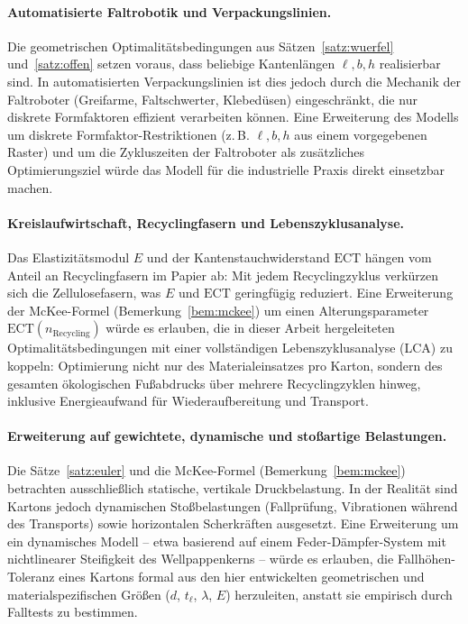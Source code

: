 ﻿\documentclass[a4paper,12pt]{article}
\theoremstyle{definition}
\begin{document}
\paragraph{Automatisierte Faltrobotik und Verpackungslinien.}
Die geometrischen Optimalitätsbedingungen aus Sätzen~\ref{satz:wuerfel}
und~\ref{satz:offen} setzen voraus, dass beliebige Kantenlängen $\ell, b, h$
realisierbar sind. In automatisierten Verpackungslinien ist dies jedoch durch
die Mechanik der Faltroboter (Greifarme, Faltschwerter, Klebedüsen)
eingeschränkt, die nur diskrete Formfaktoren effizient verarbeiten können. Eine
Erweiterung des Modells um diskrete Formfaktor-Restriktionen (z.\,B.
$\ell, b, h$ aus einem vorgegebenen Raster) und um die
Zykluszeiten der Faltroboter als zusätzliches Optimierungsziel würde das Modell
für die industrielle Praxis direkt einsetzbar machen.

\paragraph{Kreislaufwirtschaft, Recyclingfasern und Lebenszyklusanalyse.}
Das Elastizitätsmodul $E$ und der Kantenstauchwiderstand $\mathrm{ECT}$ hängen
vom Anteil an Recyclingfasern im Papier ab: Mit jedem Recyclingzyklus verkürzen
sich die Zellulosefasern, was $E$ und $\mathrm{ECT}$ geringfügig reduziert. Eine
Erweiterung der McKee-Formel (Bemerkung~\ref{bem:mckee}) um einen
Alterungsparameter $\mathrm{ECT}(n_{\text{Recycling}})$ würde es erlauben, die
in dieser Arbeit hergeleiteten Optimalitätsbedingungen mit einer vollständigen
Lebenszyklusanalyse (LCA) zu koppeln: Optimierung nicht nur des
Materialeinsatzes pro Karton, sondern des gesamten ökologischen Fußabdrucks über
mehrere Recyclingzyklen hinweg, inklusive Energieaufwand für Wiederaufbereitung
und Transport.

\paragraph{Erweiterung auf gewichtete, dynamische und stoßartige Belastungen.}
Die Sätze~\ref{satz:euler} und die McKee-Formel (Bemerkung~\ref{bem:mckee})
betrachten ausschließlich statische, vertikale Druckbelastung. In der Realität
sind Kartons jedoch dynamischen Stoßbelastungen (Fallprüfung, Vibrationen
während des Transports) sowie horizontalen Scherkräften ausgesetzt. Eine
Erweiterung um ein dynamisches Modell -- etwa basierend auf einem
Feder-Dämpfer-System mit nichtlinearer Steifigkeit des Wellpappenkerns --
würde es erlauben, die Fallhöhen-Toleranz eines Kartons formal aus den hier
entwickelten geometrischen und materialspezifischen Größen ($d$, $t_\ell$,
$\lambda$, $E$) herzuleiten, anstatt sie empirisch durch Falltests zu
bestimmen.
\end{document}
